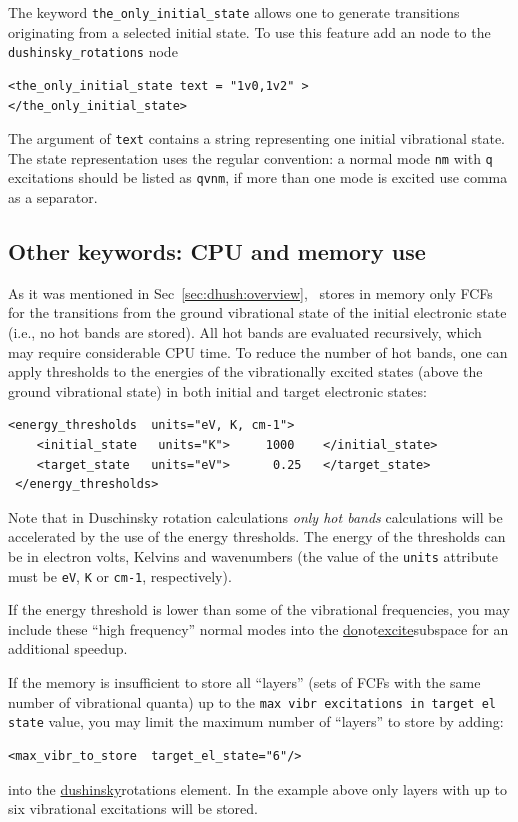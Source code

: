 \documentclass[11pt]{article}
\begin{document}
The keyword {\tt{}the\_only\_initial\_state} allows one to generate transitions originating from a
selected initial state. To use this feature add an \xml node to the {\tt{}dushinsky\_rotations} node 
\begin{lstlisting}[frame=single,framerule=0pt]
<the_only_initial_state text = "1v0,1v2" >
</the_only_initial_state>
\end{lstlisting}
The argument of {\tt{}text} contains a string representing one initial vibrational state. The state representation uses the regular convention: a normal mode {\tt{}nm} with {\tt{}q} excitations should be listed as {\tt{}qvnm}, if more than one mode is excited use comma as a separator. 

\subsection{Other keywords: CPU and memory use}

As it was mentioned in Sec~\ref{sec:dhush:overview}, \ezFCF\ stores in memory only FCFs 
for the transitions from the ground vibrational state of the initial electronic state (i.e., no hot bands are stored).
All hot bands are evaluated recursively, which may require considerable CPU time. 
To reduce the number of hot bands, one can apply thresholds
to the energies of the vibrationally excited states 
(above the ground vibrational state) in both initial and target electronic states:
\begin{lstlisting}[frame=single,framerule=0pt]
 <energy_thresholds  units="eV, K, cm-1">
    <initial_state   units="K">     1000    </initial_state>
    <target_state   units="eV">      0.25   </target_state>
 </energy_thresholds>
\end{lstlisting}
Note that in Duschinsky rotation calculations {\em only hot bands} calculations 
will be accelerated by the use of the energy thresholds.
The energy of the thresholds can be in electron volts, Kelvins and wavenumbers 
(the value of the {\tt units} attribute must be {\tt eV}, {\tt K} or {\tt cm-1}, respectively).

If the energy threshold is lower than some of the vibrational frequencies, 
you may include these ``high frequency'' normal modes
into the \ul{do}{not}\ul{excite}{subspace} for an additional speedup.

If the memory is insufficient to store all ``layers'' (sets of FCFs with the same number of vibrational quanta)
up to the {\tt max vibr excitations in target el state} value, you may limit the maximum number of ``layers'' to store 
by adding:
\begin{lstlisting}[frame=single,framerule=0pt]
  <max_vibr_to_store  target_el_state="6"/>
\end{lstlisting}
into the \ul{dushinsky}{rotations} element.
In the example above only layers with up to six vibrational excitations will be stored.
\end{document}
